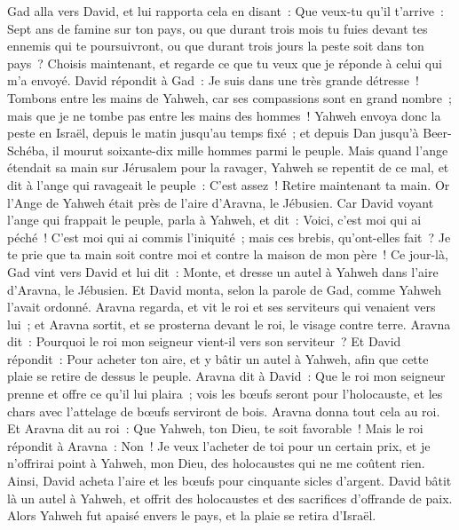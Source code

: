 \begin{multicols}{2}
Gad alla vers David, et lui rapporta cela en disant~: Que veux-tu qu'il t'arrive~: Sept ans de famine sur ton pays, ou que durant trois mois tu fuies devant tes ennemis qui te poursuivront, ou que durant trois jours la peste soit dans ton pays~? Choisis maintenant, et regarde ce que tu veux que je réponde à celui qui m'a envoyé.
David répondit à Gad~: Je suis dans une très grande détresse~! Tombons entre les mains de Yahweh, car ses compassions sont en grand nombre~; mais que je ne tombe pas entre les mains des hommes~!
Yahweh envoya donc la peste en Israël, depuis le matin jusqu'au temps fixé~; et depuis Dan jusqu'à Beer-Schéba, il mourut soixante-dix mille hommes parmi le peuple.
Mais quand l'ange étendait sa main sur Jérusalem pour la ravager, Yahweh se repentit de ce mal, et dit à l'ange qui ravageait le peuple~: C'est assez~! Retire maintenant ta main. Or l'Ange de Yahweh était près de l'aire d'Aravna, le Jébusien.
Car David voyant l'ange qui frappait le peuple, parla à Yahweh, et dit~: Voici, c'est moi qui ai péché~! C'est moi qui ai commis l'iniquité~; mais ces brebis, qu'ont-elles fait~? Je te prie que ta main soit contre moi et contre la maison de mon père~!
Ce jour-là, Gad vint vers David et lui dit~: Monte, et dresse un autel à Yahweh dans l'aire d'Aravna, le Jébusien.
Et David monta, selon la parole de Gad, comme Yahweh l'avait ordonné.
Aravna regarda, et vit le roi et ses serviteurs qui venaient vers lui~; et Aravna sortit, et se prosterna devant le roi, le visage contre terre.
Aravna dit~: Pourquoi le roi mon seigneur vient-il vers son serviteur~? Et David répondit~: Pour acheter ton aire, et y bâtir un autel à Yahweh, afin que cette plaie se retire de dessus le peuple.
Aravna dit à David~: Que le roi mon seigneur prenne et offre ce qu'il lui plaira~; vois les bœufs seront pour l'holocauste, et les chars avec l'attelage de bœufs serviront de bois.
Aravna donna tout cela au roi. Et Aravna dit au roi~: Que Yahweh, ton Dieu, te soit favorable~!
Mais le roi répondit à Aravna~: Non~! Je veux l'acheter de toi pour un certain prix, et je n'offrirai point à Yahweh, mon Dieu, des holocaustes qui ne me coûtent rien. Ainsi, David acheta l'aire et les bœufs pour cinquante sicles d'argent.
David bâtit là un autel à Yahweh, et offrit des holocaustes et des sacrifices d'offrande de paix. Alors Yahweh fut apaisé envers le pays, et la plaie se retira d'Israël.
\PPE{}
\end{multicols}
